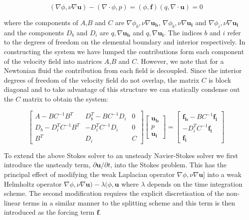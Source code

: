 \begin{subequations}
\begin{equation}
 (\nabla \phi,\nu \nabla \boldsymbol{u}) - (\nabla\cdot\phi,p)=(\phi,\boldsymbol{f})
\end{equation}
\begin{equation}
 (q,\nabla \cdot \boldsymbol{u}) = 0
\end{equation}
\end{subequations}

where the components of $A$,$B$ and $C$ are $\nabla\phi_b,\nu\nabla\boldsymbol{u_b}$, $\nabla\phi_b,\nu\nabla\boldsymbol{u_i}$ and $\nabla\phi_i,\nu\nabla\boldsymbol{u_i}$ and the components $D_b$ and $D_i$ are $q,\nabla\boldsymbol{u_b}$ and $q,\nabla\boldsymbol{u_i}$.
The indices $b$ and $i$ refer to the degrees of freedom on the elemental boundary and interior respectively. In constructing the system we have lumped the contributions form each component of the velocity field into matrices $A$,$B$ and $C$. However, we note that for a Newtonian fluid the contribution from each field is decoupled. Since the interior degrees of freedom of the velocity field do not overlap, the matrix $C$ is block diagonal and to take advantage of this structure we can statically condense out the $C$ matrix to obtain the system:

\begin{equation}
\left[ \begin{array}{ccc}
 A-BC^{-1}B^T & D_b^T-BC^{-1}D_i & 0\\
 D_b-D_i^TC^{-1}B^T & -D_i^TC^{-1}D_i & 0\\
 B^T & D_i & C
 \end{array}\right]
 \left[ \begin{array}{c}
 \boldsymbol{u_b}\\
 p\\
 \boldsymbol{u_i}
 \end{array}\right] =
 \left[ \begin{array}{c}
 \boldsymbol{f_b} - BC^{-1}\boldsymbol{f_i}\\
 -D_i^TC^{-1}\boldsymbol{f_i}\\
 \boldsymbol{f_i}
 \end{array}\right]
 \end{equation}

 To extend the above Stokes solver to an unsteady Navier-Stokes solver we first introduce the unsteady term, $\partial \boldsymbol{u}/\partial t$, into the Stokes problem.
This has the principal effect of modifying the weak Laplacian operator $\nabla\phi,\nu\nabla\boldsymbol{u}$] into a weak Helmholtz operator
$\nabla\phi,\nu\nabla\boldsymbol{u})-\lambda(\phi,\boldsymbol{u}$ where $\lambda$ depends on the time integration scheme. The second modification requires the explicit discretisation of the non-linear terms in a similar manner to the splitting scheme and this term is then introduced as the forcing term $\boldsymbol{f}$.

